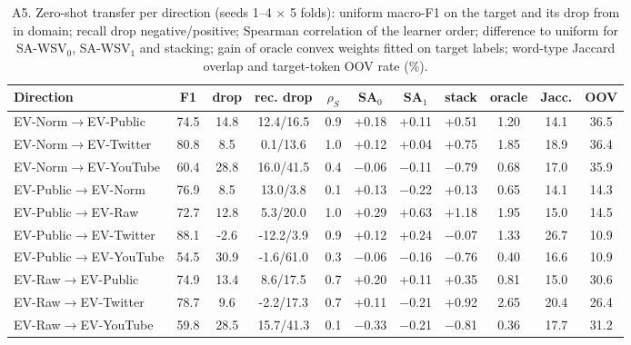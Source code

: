 \begin{table}[!htbp]\centering\scriptsize\setlength{\tabcolsep}{2pt}
\caption*{A5. Zero-shot transfer per direction (seeds 1--4 $\times$ 5 folds): uniform macro-F1 on the target and its drop from in domain; recall drop negative/positive; Spearman correlation of the learner order; difference to uniform for SA-WSV$_0$, SA-WSV$_1$ and stacking; gain of oracle convex weights fitted on target labels; word-type Jaccard overlap and target-token OOV rate (\%).}
\begin{tabular}{lcccccccccc}\toprule
Direction & F1 & drop & rec. drop & $\rho_S$ & SA$_0$ & SA$_1$ & stack & oracle & Jacc. & OOV \\ \midrule
EV-Norm$\to$EV-Public & 74.5 & 14.8 & 12.4/16.5 & 0.9 & +0.18 & +0.11 & +0.51 & 1.20 & 14.1 & 36.5 \\
EV-Norm$\to$EV-Twitter & 80.8 & 8.5 & 0.1/13.6 & 1.0 & +0.12 & +0.04 & +0.75 & 1.85 & 18.9 & 36.4 \\
EV-Norm$\to$EV-YouTube & 60.4 & 28.8 & 16.0/41.5 & 0.4 & $-$0.06 & $-$0.11 & $-$0.79 & 0.68 & 17.0 & 35.9 \\
EV-Public$\to$EV-Norm & 76.9 & 8.5 & 13.0/3.8 & 0.1 & +0.13 & $-$0.22 & +0.13 & 0.65 & 14.1 & 14.3 \\
EV-Public$\to$EV-Raw & 72.7 & 12.8 & 5.3/20.0 & 1.0 & +0.29 & +0.63 & +1.18 & 1.95 & 15.0 & 14.5 \\
EV-Public$\to$EV-Twitter & 88.1 & -2.6 & -12.2/3.9 & 0.9 & +0.12 & +0.24 & $-$0.07 & 1.33 & 26.7 & 10.9 \\
EV-Public$\to$EV-YouTube & 54.5 & 30.9 & -1.6/61.0 & 0.3 & $-$0.06 & $-$0.16 & $-$0.76 & 0.40 & 16.6 & 10.9 \\
EV-Raw$\to$EV-Public & 74.9 & 13.4 & 8.6/17.5 & 0.7 & +0.20 & +0.11 & +0.35 & 0.81 & 15.0 & 30.6 \\
EV-Raw$\to$EV-Twitter & 78.7 & 9.6 & -2.2/17.3 & 0.7 & +0.11 & $-$0.21 & +0.92 & 2.65 & 20.4 & 26.4 \\
EV-Raw$\to$EV-YouTube & 59.8 & 28.5 & 15.7/41.3 & 0.1 & $-$0.33 & $-$0.21 & $-$0.81 & 0.36 & 17.7 & 31.2 \\
\bottomrule\end{tabular}\end{table}

